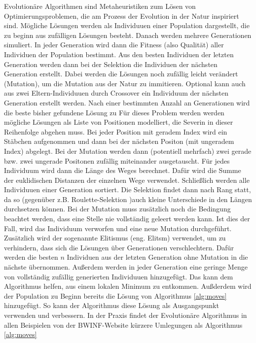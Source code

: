 \documentclass[a4paper,10pt,ngerman]{scrartcl}
\begin{document}
Evolutionäre Algorithmen sind Metaheuristiken zum Lösen von Optimierungsproblemen, die am Prozess der Evolution in der Natur inspiriert sind. 
Mögliche Lösungen werden als Individuuen einer Population dargestellt, die zu beginn aus zufälligen Lösungen besteht. 
Danach werden mehrere Generationen simuliert. 
In jeder Generation wird dann die Fitness (also Qualität) aller Individuen der Population bestimmt.
Aus den besten Individuen der letzten Generation werden dann bei der Selektion die Individuen der nächsten Generation erstellt. Dabei werden die Lösungen noch zufällig leicht verändert (Mutation), um die Mutation aus der Natur zu immitieren. 
Optional kann auch aus zwei Eltern-Individuuen durch Crossover ein Individuum der nächsten Generation erstellt werden. 
Nach einer bestimmten Anzahl an Generationen wird die beste bisher gefundene Lösung zu
Für dieses Problem werden werden mögliche Lösungen als Liste von Positionen modelliert, die Severin in dieser Reihenfolge abgehen muss. 
Bei jeder Position mit geradem Index wird ein Stäbchen aufgenommen und dann bei der nächsten Positon (mit ungeradem Index) abgelegt. 
Bei der Mutation werden dann (potentiell mehrfach) zwei gerade bzw. zwei ungerade Positonen zufällig miteinander ausgetauscht. 
Für jedes Individuum wird dann die Länge des Weges berechnet. 
Dafür wird die Summe der euklidischen Distanzen der einzelnen Wege verwendet. 
Schließlich werden alle Individuuen einer Generation sortiert.
Die Selektion findet dann nach Rang statt, da so (gegenüber z.B. Roulette-Selektion )auch kleine Unterschiede in den Längen durchsetzen können. 
Bei der Mutation muss zusätzlich noch die Bedingung beachtet werden, dass eine Stelle nie vollständig geleert werden kann.
Ist dies der Fall, wird das Individuum verworfen und eine neue Mutation durchgeführt. 
Zusätzlich wird der sogenannte Elitismus (eng. Elitsm) verwendet, um zu verhindern, dass sich die Lösungen über Generationen verschlechtern. Dafür werden die besten $n$ Individuen aus der letzten Generation ohne Mutation in die nächste übernommen. 
Außerdem werden in jeder Generation eine geringe Menge von vollständig zufällig generierten Individuuen hinzugefügt. 
Das kann dem Algorithmus helfen, aus einem lokalen Minimum zu entkommen. 
Außderdem wird der Population zu Beginn bereits die Lösung von Algorithmus \ref{alg:moves} hinzugefügt. So kann der Algorithmus diese Lösung als Ausgangspunkt verwenden und verbessern. 
In der Praxis findet der Evolutionäre Algorithmus in allen Beispielen von der BWINF-Website kürzere Umlegungen als Algorithmus \ref{alg:moves}
\end{document}
